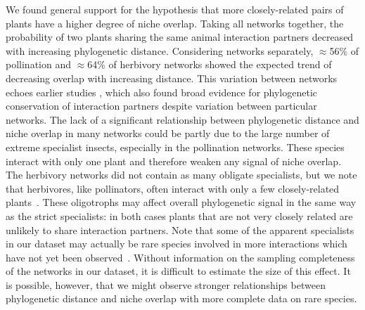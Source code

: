 \documentclass[12pt]{article}
\begin{document}
\begin{spacing}{1.5}
  We found general support for the hypothesis that more
  closely-related pairs of plants have a higher degree
  of niche overlap. Taking all networks together, 
  the probability of two plants sharing the same animal 
  interaction partners decreased with increasing 
  phylogenetic distance. Considering networks separately,
  $\approx$56\%  of pollination and $\approx$64\% of
  herbivory networks showed the expected trend of decreasing 
  overlap with increasing distance. This variation between networks
  echoes earlier studies \citep[e.g.,][]{Fontaine2015,Hutchinson2017},
  which also found broad evidence for phylogenetic conservation 
  of interaction partners despite variation between particular 
  networks. The lack of a significant relationship between
  phylogenetic distance and niche overlap in many
  networks could be partly due to the large number of extreme
  specialist insects, especially in the pollination networks.
  These species interact with only one plant and
  therefore weaken any signal of niche overlap.
  The herbivory networks did not contain as many obligate 
  specialists, but we note that herbivores, like pollinators, often interact with only a few closely-related plants~\citep{Novotny2005,Brandle2006,Astegiano2017}.
  These oligotrophs may affect overall phylogenetic signal in the same
  way as the strict specialists: in both cases plants that are not very closely related are unlikely to share interaction partners. Note that some of the apparent specialists in our dataset may actually be rare species involved in more interactions which have not yet been observed~\citep{Bluthgen2006,Poisot2015}. Without information on the sampling completeness of the networks in our dataset, it is difficult to estimate the size of this effect. 
  It is possible, however, that we might observe stronger relationships between phylogenetic
  distance and niche overlap with more complete data on rare species.



\end{spacing}
\end{document}
